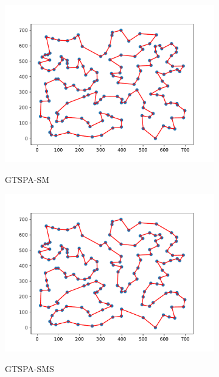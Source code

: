 \documentclass[12pt]{article}
\theoremstyle{plain}
\theoremstyle{definition}
\theoremstyle{remark}
\begin{document}
\begin{figure}[ht]
\begin{subfigure}{.5\textwidth}
		\includegraphics[scale = 0.44]{../../Implementation/gen/best_path_gtspasm_ch150}
		\label{fig:best_path_gtspasm_ch150}
		\caption{GTSPA-SM}
	\end{subfigure}%
	\begin{subfigure}{.5\textwidth}
		\centering
		\includegraphics[scale = 0.44]{../../Implementation/gen/best_path_gtspasms_ch150}
		\label{fig:best_path_gtspasms_ch150}
		\caption{GTSPA-SMS}
	\end{subfigure}
	\begin{subfigure}{.5\textwidth}
		\centering

\end{subfigure}
\end{figure}
\end{document}
